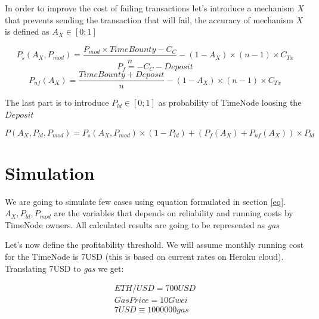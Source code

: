 \documentclass{report}
\begin{document}
\begin{appendices}
  In order to improve the cost of failing transactions let's introduce a mechanism $X$ that prevents sending the transaction that will fail, the accuracy of mechanism $X$ is defined as $A_{X} \in [0;1]$

  \[
  P_{s}(A_{X}, P_{mod})=\frac{P_{mod} \times TimeBounty-C_{C}}{n} - (1-A_{X}) \times (n-1) \times C_{Tx}
  \]
  \[
  P_{f}=-C_{C}-Deposit
  \]
  \[
  P_{nf}(A_{X})=\frac{TimeBounty+Deposit}{n} - (1-A_{X}) \times (n-1) \times C_{Tx}
  \]

  The last part is to introduce $P_{ld} \in [0;1]$ as probability of TimeNode loosing the $Deposit$


  \[
  \label{eq}
  P(A_{X}, P_{ld}, P_{mod})=P_{s}(A_{X}, P_{mod}) \times (1-P_{ld}) + (P_{f}(A_{X})+P_{nf}(A_{X})) \times P_{ld}
  \]
  \section{Simulation}
  We are going to simulate few cases using equation formulated in section \ref{eq}. $A_{X}, P_{ld}, P_{mod}$ are the variables that depends on reliability and running costs by TimeNode owners. All calculated results are going to be represented as \textit{gas}

  Let's now define the profitability threshold. We will assume monthly running cost for the TimeNode is 7USD (this is based on current rates on Heroku cloud). Translating 7USD to \textit{gas} we get:

  \begin{align*}
  ETH/USD=700USD\\
  Gas Price = 10Gwei\\
  7USD \equiv 1000000gas
  \end{align*}


\end{appendices}
\end{document}

